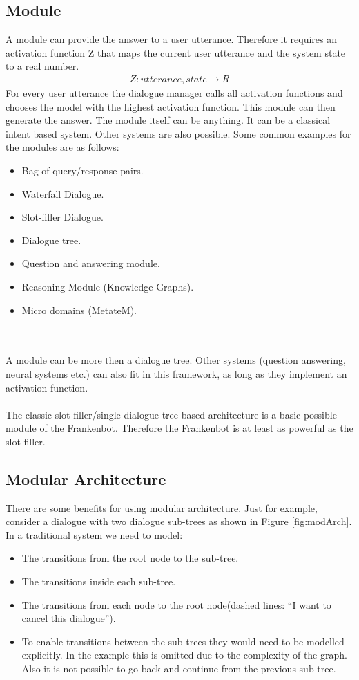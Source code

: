 \subsection{Module}
A module can provide the answer to a user utterance. Therefore it requires an activation function Z that maps the current user utterance and the system state to a real number.
\begin{align*}
 Z: utterance, state \rightarrow R
\end{align*} 
For every user utterance the dialogue manager calls all activation functions and chooses the model with the highest activation function. This module can then generate the answer. The module itself can be anything. It can be a classical intent based system. Other systems are also possible. Some common examples for the modules are as follows:
\begin{itemize}
\item Bag of query/response pairs.
\item Waterfall Dialogue.       
\item Slot-filler Dialogue.
\item Dialogue tree.
\item Question and answering module.
\item Reasoning Module (Knowledge Graphs).
\item Micro domains (MetateM).
\end{itemize}
\\~\\
A module can be more then a dialogue tree. Other systems (question answering, neural systems etc.) can also fit in this framework, as long as they implement an activation function.
\\~\\
The classic slot-filler/single dialogue tree based architecture is a basic possible module of the Frankenbot. Therefore the Frankenbot is at least as powerful as the slot-filler.

\subsection{Modular Architecture}
There are some benefits for using modular architecture. Just for example, consider a dialogue with two dialogue sub-trees as shown in Figure \ref{fig:modArch}. In a traditional system we need to model:
\begin{itemize}
\item The transitions from the root node to the sub-tree.
\item The transitions inside each sub-tree.       
\item The transitions from each node to the root node(dashed lines: “I want to cancel this dialogue”).
\item To enable transitions between the sub-trees they would need to be modelled explicitly. In the example this is omitted due to the complexity of the graph. Also it is not possible to go back and continue from the previous sub-tree.
\end{itemize}

